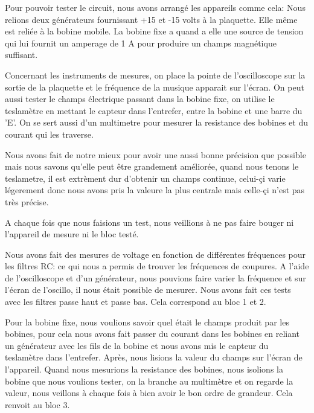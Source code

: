 

Pour pouvoir tester le circuit, nous avons arrangé les appareils comme cela: Nous relions deux générateurs fournissant +15 et 
-15 volts à la plaquette.  Elle même est reliée à la bobine mobile.  La bobine fixe a quand a elle une source de tension qui 
lui fournit un amperage de 1 A pour produire un champs magnétique suffisant.


Concernant les instruments de mesures, on place la pointe de l'oscilloscope sur la sortie de la plaquette et le fréquence
de la musique apparait sur l'écran.  On peut aussi tester le champs électrique passant dans la bobine fixe, on utilise le
teslamètre en mettant le capteur dans l'entrefer, entre la bobine et une barre du 'E'.  On se sert aussi d'un multimetre
pour mesurer la resistance des bobines et du courant qui les traverse.


Nous avons fait de notre mieux pour avoir une aussi bonne précision que possible mais nous savons qu'elle peut être grandement
améliorée, quand nous tenons le teslametre, il est extrèment dur d'obtenir un champs continue, celui-çi varie légerement donc
nous avons pris la valeure la plus centrale mais celle-çi n'est pas très précise.


A chaque fois que nous faisions un test, nous veillions à ne pas faire bouger ni l'appareil de mesure ni le bloc testé.

Nous avons fait des mesures de voltage en fonction de différentes fréquences pour les filtres RC: ce qui nous a permis
de trouver les fréquences de coupures. A l'aide de l'oscilloscope et d'un générateur, nous pouvions faire varier
la fréquence et sur l'écran de l'oscillo, il nous était possible de mesurer.  Nous avons fait ces tests avec les filtres passe haut et passe bas.  Cela correspond 
au bloc 1 et 2.

Pour la bobine fixe, nous voulions savoir quel était le champs produit par les bobines, pour cela nous avons fait passer
du courant dans les bobines en reliant un générateur avec les fils de la bobine et nous avons mis le capteur du teslamètre 
dans l'entrefer.  Après, nous lisions la valeur du champs sur l'écran de l'appareil.
Quand nous mesurions la resistance des bobines, nous isolions la bobine que nous voulions tester, on la branche au multimètre
et on regarde la valeur, nous veillons à chaque fois à bien avoir le bon ordre de grandeur. Cela renvoit au bloc 3.

